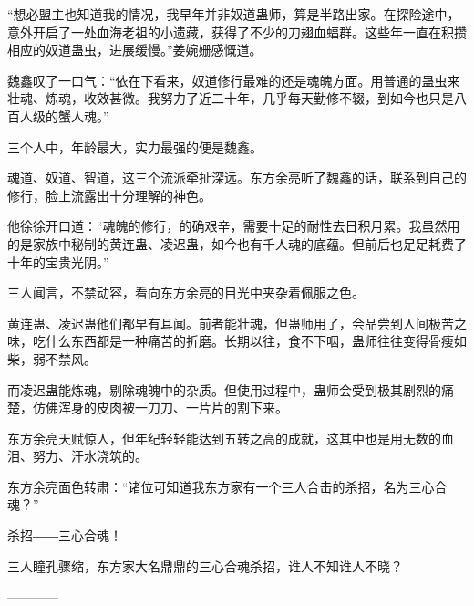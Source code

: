 \begin{this_body}
“想必盟主也知道我的情况，我早年并非奴道蛊师，算是半路出家。在探险途中，意外开启了一处血海老祖的小遗藏，获得了不少的刀翅血蝠群。这些年一直在积攒相应的奴道蛊虫，进展缓慢。”姜婉姗感慨道。

魏鑫叹了一口气：“依在下看来，奴道修行最难的还是魂魄方面。用普通的蛊虫来壮魂、炼魂，收效甚微。我努力了近二十年，几乎每天勤修不辍，到如今也只是八百人级的蟹人魂。”

三个人中，年龄最大，实力最强的便是魏鑫。

魂道、奴道、智道，这三个流派牵扯深远。东方余亮听了魏鑫的话，联系到自己的修行，脸上流露出十分理解的神色。

他徐徐开口道：“魂魄的修行，的确艰辛，需要十足的耐性去日积月累。我虽然用的是家族中秘制的黄连蛊、凌迟蛊，如今也有千人魂的底蕴。但前后也足足耗费了十年的宝贵光阴。”

三人闻言，不禁动容，看向东方余亮的目光中夹杂着佩服之色。

黄连蛊、凌迟蛊他们都早有耳闻。前者能壮魂，但蛊师用了，会品尝到人间极苦之味，吃什么东西都是一种痛苦的折磨。长期以往，食不下咽，蛊师往往变得骨瘦如柴，弱不禁风。

而凌迟蛊能炼魂，剔除魂魄中的杂质。但使用过程中，蛊师会受到极其剧烈的痛楚，仿佛浑身的皮肉被一刀刀、一片片的割下来。

东方余亮天赋惊人，但年纪轻轻能达到五转之高的成就，这其中也是用无数的血泪、努力、汗水浇筑的。

东方余亮面色转肃：“诸位可知道我东方家有一个三人合击的杀招，名为三心合魂？”

杀招――三心合魂！

三人瞳孔骤缩，东方家大名鼎鼎的三心合魂杀招，谁人不知谁人不晓？

------------

\end{this_body}

